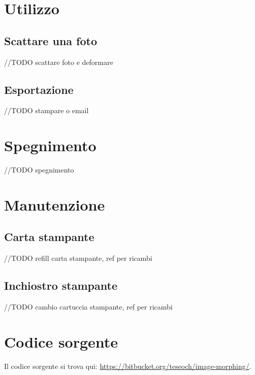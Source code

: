 \documentclass[12pt]{article}
\begin{document}
		
		
\section{Utilizzo}

	\subsection{Scattare una foto}

		//TODO scattare foto e deformare
	
	
	\subsection{Esportazione}
	
		//TODO stampare o email
		
	
	
\section{Spegnimento}
	
		//TODO spegnimento
	
	
	
\section{Manutenzione}

	\subsection{Carta stampante}
	
		//TODO refill carta stampante, ref per ricambi
		
		
	\subsection{Inchiostro stampante}
	
		//TODO cambio cartuccia stampante, ref per ricambi
		
		
\section{Codice sorgente}

	Il codice sorgente si trova qui: \url{https://bitbucket.org/teseoch/image-morphing/}.
		
	
\end{document}
